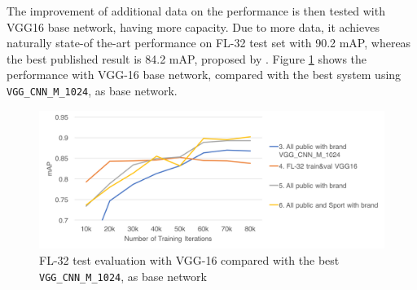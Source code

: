 The improvement of additional data on the performance is then tested with VGG16 base network, having more capacity. Due to more data, it achieves naturally state-of the-art performance on FL-32 test set with 90.2 mAP, whereas the best published result is 84.2 mAP, proposed by \cite{Bao:2016:RCL:3007669.3007728}. Figure \ref{f:vgg16fltest} shows the performance with VGG-16 base network, compared with the best system using \texttt{VGG\_CNN\_M\_1024}, as base network.

\begin{figure}
  \centering
  \includegraphics[width=150mm]{images/mt/vgg16fltest.png}
  \caption{FL-32 test evaluation with VGG-16 compared with the best \texttt{VGG\_CNN\_M\_1024}, as base network}
  \label{f:vgg16fltest}
\end{figure}